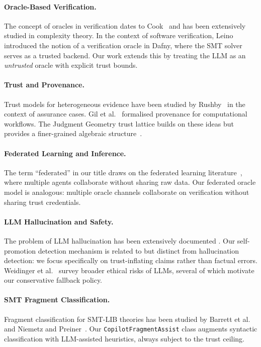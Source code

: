 \documentclass[11pt]{article}
\newcommand{\CopFragment}{\texttt{CopilotFragmentAssist}}
\begin{document}
\paragraph{Oracle-Based Verification.}
The concept of oracles in verification dates to
Cook~\cite{cook1971complexity} and has been extensively studied in
complexity theory.  In the context of software verification,
Leino~\cite{leino2010dafny} introduced the notion of a verification
oracle in Dafny, where the SMT solver serves as a trusted backend.
Our work extends this by treating the LLM as an \emph{untrusted}
oracle with explicit trust bounds.

\paragraph{Trust and Provenance.}
Trust models for heterogeneous evidence have been studied by
Rushby~\cite{rushby2013logic} in the context of assurance cases.
Gil et al.~\cite{gil2007towards} formalised provenance for
computational workflows.  The Judgment Geometry trust lattice
builds on these ideas but provides a finer-grained algebraic
structure~\cite{young2024jg1,young2024jg4}.

\paragraph{Federated Learning and Inference.}
The term ``federated'' in our title draws on the federated learning
literature~\cite{mcmahan2017communication,kairouz2021advances},
where multiple agents collaborate without sharing raw data.  Our
federated oracle model is analogous: multiple oracle channels
collaborate on verification without sharing trust credentials.

\paragraph{LLM Hallucination and Safety.}
The problem of LLM hallucination has been extensively documented
\cite{ji2023hallucination,maynez2020faithfulness}.  Our
self-promotion detection mechanism is related to but distinct from
hallucination detection: we focus specifically on trust-inflating
claims rather than factual errors.  Weidinger et
al.~\cite{weidinger2021ethical} survey broader ethical risks of
LLMs, several of which motivate our conservative fallback policy.

\paragraph{SMT Fragment Classification.}
Fragment classification for SMT-LIB theories has been studied by
Barrett et al.~\cite{barrett2010smt} and
Niemetz and Preiner~\cite{niemetz2020bitwuzla}.  Our
\CopFragment{} class augments syntactic classification with
LLM-assisted heuristics, always subject to the trust ceiling.
\end{document}
